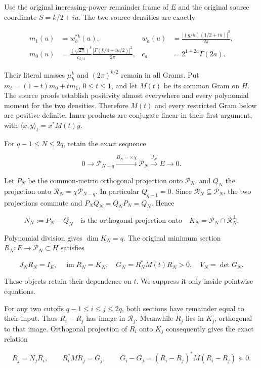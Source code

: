 Use the original increasing-power remainder frame of \(E\) and the original source coordinate \(S=k/2+iu\). The two source densities are exactly

\[
\begin{aligned}
m_1(u)&=w_h^{*k}(u),&w_h(u)&=\frac{|(g/h)(1/2+iu)|^2}{2\pi},\\
m_0(u)&=\frac{(\sqrt{2\pi})^k}{c_{k/4}}
 \frac{|\Gamma(k/4+iu/2)|^2}{2\pi},&c_a&=2^{1-2a}\Gamma(2a).
\end{aligned}
\tag{AA2}
\]

Their literal masses \(\mu_h^k\) and \((2\pi)^{k/2}\) remain in all Grams. Put \(m_t=(1-t)m_0+tm_1\), \(0\le t\le1\), and let \(M(t)\) be its common Gram on \(H\). The source proofs establish positivity almost everywhere and every polynomial moment for the two densities. Therefore \(M(t)\) and every restricted Gram below are positive definite. Inner products are conjugate-linear in their first argument, with \(\langle x,y\rangle_t=x^*M(t)y\).

For \(q-1\le N\le2q\), retain the exact sequence

\[
0\to\mathcal P_{N-q}\xrightarrow{B_N=\times\chi}
\mathcal P_N\xrightarrow{J_N}E\to0.
\tag{AA3}
\]

Let \(P_N\) be the common-metric orthogonal projection onto \(\mathcal P_N\), and \(Q_N\) the projection onto \(\mathcal R_N=\chi\mathcal P_{N-q}\). In particular \(Q_{q-1}=0\). Since \(\mathcal R_N\subseteq\mathcal P_N\), the two projections commute and \(P_NQ_N=Q_NP_N=Q_N\). Hence

\[
N_N:=P_N-Q_N
\quad\text{is the orthogonal projection onto}\quad
K_N=\mathcal P_N\cap\mathcal R_N^\perp.
\tag{AA4}
\]

Polynomial division gives \(\dim K_N=q\). The original minimum section \(R_N:E\to\mathcal P_N\subset H\) satisfies

\[
J_NR_N=I_E,\quad\operatorname{im}R_N=K_N,
\quad G_N=R_N^*M(t)R_N>0,\quad V_N=\det G_N.
\tag{AA5}
\]

These objects retain their dependence on \(t\). We suppress it only inside pointwise equations.

For any two cutoffs \(q-1\le i\le j\le2q\), both sections have remainder equal to their input. Thus \(R_i-R_j\) has image in \(\mathcal R_j\). Meanwhile \(R_j\) lies in \(K_j\), orthogonal to that image. Orthogonal projection of \(R_i\) onto \(K_j\) consequently gives the exact relation

\[
R_j=N_jR_i,\qquad
R_i^*MR_j=G_j,
\qquad
G_i-G_j=(R_i-R_j)^*M(R_i-R_j)\succeq0.
\tag{AA6}
\]

